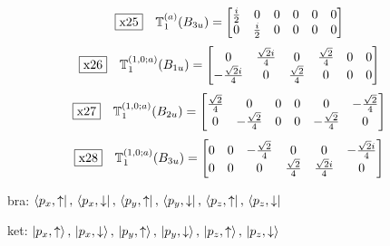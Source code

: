 \documentclass[fleqn,10pt,landscape]{jsarticle}
\begin{document}
\begin{dmath*}
\fbox{x25}\quad \mathbb{T}_{1}^{(a)}(B_{3u})=\begin{bmatrix} \frac{i}{2} & 0 & 0 & 0 & 0 & 0 \\ 0 & \frac{i}{2} & 0 & 0 & 0 & 0 \end{bmatrix}
\end{dmath*}
\begin{dmath*}
\fbox{x26}\quad \mathbb{T}_{1}^{(1,0;a)}(B_{1u})=\begin{bmatrix} 0 & \frac{\sqrt{2} i}{4} & 0 & \frac{\sqrt{2}}{4} & 0 & 0 \\ - \frac{\sqrt{2} i}{4} & 0 & \frac{\sqrt{2}}{4} & 0 & 0 & 0 \end{bmatrix}
\end{dmath*}
\begin{dmath*}
\fbox{x27}\quad \mathbb{T}_{1}^{(1,0;a)}(B_{2u})=\begin{bmatrix} \frac{\sqrt{2}}{4} & 0 & 0 & 0 & 0 & - \frac{\sqrt{2}}{4} \\ 0 & - \frac{\sqrt{2}}{4} & 0 & 0 & - \frac{\sqrt{2}}{4} & 0 \end{bmatrix}
\end{dmath*}
\begin{dmath*}
\fbox{x28}\quad \mathbb{T}_{1}^{(1,0;a)}(B_{3u})=\begin{bmatrix} 0 & 0 & - \frac{\sqrt{2}}{4} & 0 & 0 & - \frac{\sqrt{2} i}{4} \\ 0 & 0 & 0 & \frac{\sqrt{2}}{4} & \frac{\sqrt{2} i}{4} & 0 \end{bmatrix}
\end{dmath*}
\vspace{5mm}

\noindent\textbullet\, bra: $\bra{p_{x},\uparrow},\, \bra{p_{x},\downarrow},\, \bra{p_{y},\uparrow},\, \bra{p_{y},\downarrow},\, \bra{p_{z},\uparrow},\, \bra{p_{z},\downarrow}$

\noindent\textbullet\, ket: $\ket{p_{x},\uparrow},\, \ket{p_{x},\downarrow},\, \ket{p_{y},\uparrow},\, \ket{p_{y},\downarrow},\, \ket{p_{z},\uparrow},\, \ket{p_{z},\downarrow}$
\end{document}
